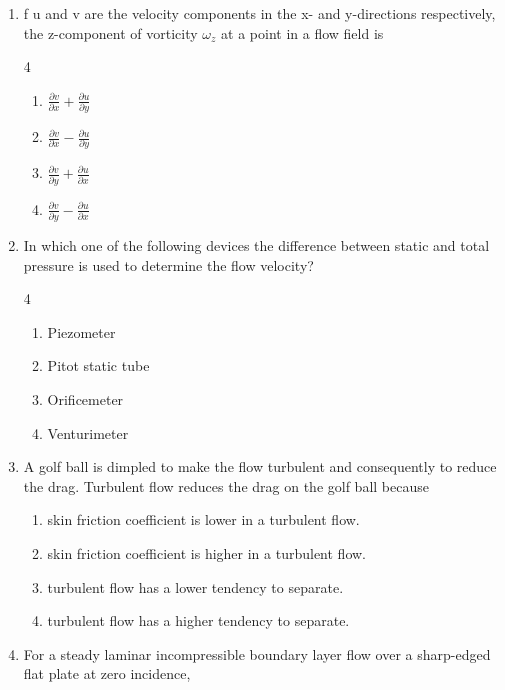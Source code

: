 \documentclass[journal]{IEEEtran}
\begin{document}
\begin{enumerate}
\item f u and v are the velocity components in the x- and y-directions respectively, the z-component of vorticity $\omega_{z}$ at a point in a flow field is

\begin{multicols} {4}
    \begin{enumerate}
        \item $\frac{\partial v}{\partial x}+\frac{\partial u}{\partial y}$
        \item $\frac{\partial v}{\partial x}-\frac{\partial u}{\partial y}$
        \item $\frac{\partial v}{\partial y}+\frac{\partial u}{\partial x}$
        \item$\frac{\partial v}{\partial y}-\frac{\partial u}{\partial x}$
    \end{enumerate}
\end{multicols}
\bigskip 

\item In which one of the following devices the difference between static and total pressure is used to determine the flow velocity?

\begin{multicols} {4}
    \begin{enumerate}
     \item Piezometer
     \item Pitot static tube
    \item Orificemeter
    \item Venturimeter
    \end{enumerate}
\end{multicols}
\bigskip 

\item A golf ball is dimpled to make the flow turbulent and consequently to reduce the drag. Turbulent flow reduces the drag on the golf ball because

\begin{enumerate}
    \item skin friction coefficient is lower in a turbulent flow.
    \item skin friction coefficient is higher in a turbulent flow.
    \item turbulent flow has a lower tendency to separate.
    \item turbulent flow has a higher tendency to separate.
\end{enumerate}
\bigskip

\item For a steady laminar incompressible boundary layer flow over a sharp-edged flat plate at zero incidence,


\end{enumerate}
\end{document}
